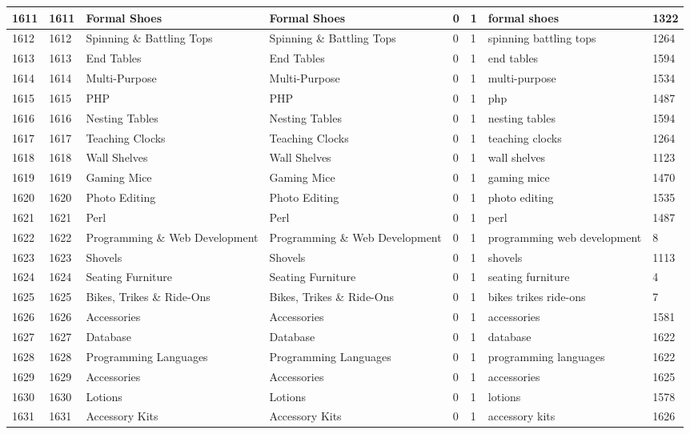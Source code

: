 \begin{longtable}{|l|l|l|l|l|l|l|l|}
1611 & 1611 & Formal Shoes & Formal Shoes & 0 & 1 & formal shoes & 1322 \\ \hline 
1612 & 1612 & Spinning \& Battling Tops & Spinning \& Battling Tops & 0 & 1 & spinning battling tops & 1264 \\ \hline 
1613 & 1613 & End Tables & End Tables & 0 & 1 & end tables & 1594 \\ \hline 
1614 & 1614 & Multi-Purpose & Multi-Purpose & 0 & 1 & multi-purpose & 1534 \\ \hline 
1615 & 1615 & PHP & PHP & 0 & 1 & php & 1487 \\ \hline 
1616 & 1616 & Nesting Tables & Nesting Tables & 0 & 1 & nesting tables & 1594 \\ \hline 
1617 & 1617 & Teaching Clocks & Teaching Clocks & 0 & 1 & teaching clocks & 1264 \\ \hline 
1618 & 1618 & Wall Shelves & Wall Shelves & 0 & 1 & wall shelves & 1123 \\ \hline 
1619 & 1619 & Gaming Mice & Gaming Mice & 0 & 1 & gaming mice & 1470 \\ \hline 
1620 & 1620 & Photo Editing & Photo Editing & 0 & 1 & photo editing & 1535 \\ \hline 
1621 & 1621 & Perl & Perl & 0 & 1 & perl & 1487 \\ \hline 
1622 & 1622 & Programming \& Web Development & Programming \& Web Development & 0 & 1 & programming web development & 8 \\ \hline 
1623 & 1623 & Shovels & Shovels & 0 & 1 & shovels & 1113 \\ \hline 
1624 & 1624 & Seating Furniture & Seating Furniture & 0 & 1 & seating furniture & 4 \\ \hline 
1625 & 1625 & Bikes, Trikes \& Ride-Ons & Bikes, Trikes \& Ride-Ons & 0 & 1 & bikes trikes ride-ons & 7 \\ \hline 
1626 & 1626 & Accessories & Accessories & 0 & 1 & accessories & 1581 \\ \hline 
1627 & 1627 & Database & Database & 0 & 1 & database & 1622 \\ \hline 
1628 & 1628 & Programming Languages & Programming Languages & 0 & 1 & programming languages & 1622 \\ \hline 
1629 & 1629 & Accessories & Accessories & 0 & 1 & accessories & 1625 \\ \hline 
1630 & 1630 & Lotions & Lotions & 0 & 1 & lotions & 1578 \\ \hline 
1631 & 1631 & Accessory Kits & Accessory Kits & 0 & 1 & accessory kits & 1626 \\ \hline 

\end{longtable}
